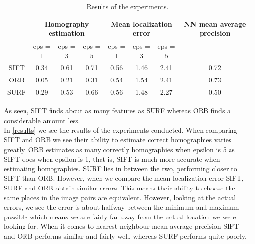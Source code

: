 \begin{table}[h]
	\centering
	\begin{tabular}{|c||ccc||ccc||c|}
		\hline
		& \multicolumn{3}{c||}{Homography estimation}                           & \multicolumn{3}{c||}{Mean localization error}                          & NN mean average precision \\ \hline
		& \multicolumn{1}{c|}{eps = 1} & \multicolumn{1}{c|}{eps = 3} & eps = 5 & \multicolumn{1}{c|}{eps = 1} & \multicolumn{1}{c|}{eps = 3} & eps = 5 &                           \\ \hline
		SIFT & \multicolumn{1}{c|}{0.34}   & \multicolumn{1}{c|}{0.61}    & 0.71    & \multicolumn{1}{c|}{0.56}    & \multicolumn{1}{c|}{1.46}    & 2.41    & 0.72                      \\ \hline
		ORB  & \multicolumn{1}{c|}{0.05}   & \multicolumn{1}{c|}{0.21}    & 0.31    & \multicolumn{1}{c|}{0.54}    & \multicolumn{1}{c|}{1.54}    & 2.41    & 0.73                      \\ \hline
		SURF & \multicolumn{1}{c|}{0.29}   & \multicolumn{1}{c|}{0.53}    & 0.66    & \multicolumn{1}{c|}{0.56}    & \multicolumn{1}{c|}{1.48}    & 2.27    & 0.50                      \\ \hline
	\end{tabular}
	\caption{Results of the experiments.}
	\label{results}
\end{table}
As seen, SIFT finds about as many features as SURF whereas ORB finds a considerable amount less.\\
In \autoref{results} we see the results of the experiments conducted. When comparing SIFT and ORB we see their ability to estimate correct homographies varies greatly. ORB estimates as many correctly homographies when epsilon is 5 as SIFT does when epsilon is 1, that is, SIFT is much more accurate when estimating homographies. SURF lies in between the two, performing closer to SIFT than ORB. However, when we compare the mean localization error SIFT, SURF and ORB obtain similar errors. This means their ability to choose the same places in the image pairs are equivalent. However, looking at the actual errors, we see the error is about halfway between the minimum and maximum possible which means we are fairly far away from the actual location we were looking for. When it comes to nearest neighbour mean average precision SIFT and ORB performs similar and fairly well, whereas SURF performs quite poorly.